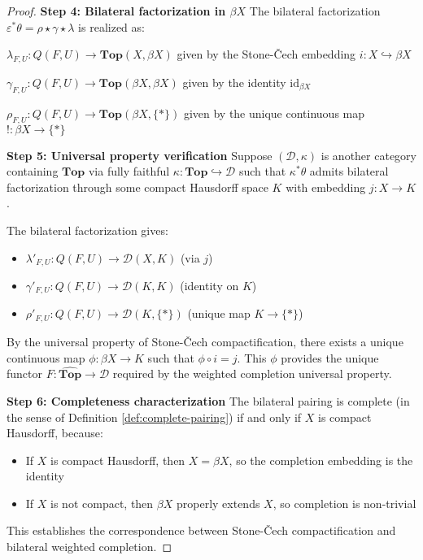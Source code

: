 \documentclass[11pt]{article}
\theoremstyle{plain}
\theoremstyle{definition}
\theoremstyle{remark}
\begin{document}
\begin{proof}
\textbf{Step 4: Bilateral factorization in $\beta X$}
The bilateral factorization $\varepsilon^* \theta = \rho \star \gamma \star \lambda$ is realized as:

$\lambda_{F,U} : Q(F, U) \to \mathbf{Top}(X, \beta X)$ given by the Stone-\v{C}ech embedding $i : X \hookrightarrow \beta X$

$\gamma_{F,U} : Q(F, U) \to \mathbf{Top}(\beta X, \beta X)$ given by the identity $\text{id}_{\beta X}$

$\rho_{F,U} : Q(F, U) \to \mathbf{Top}(\beta X, \{*\})$ given by the unique continuous map $! : \beta X \to \{*\}$

\textbf{Step 5: Universal property verification}
Suppose $(\mathcal{D}, \kappa)$ is another category containing $\mathbf{Top}$ via fully faithful $\kappa : \mathbf{Top} \hookrightarrow \mathcal{D}$ such that $\kappa^* \theta$ admits bilateral factorization through some compact Hausdorff space $K$ with embedding $j : X \to K$.

The bilateral factorization gives:
\begin{itemize}
\item $\lambda'_{F,U} : Q(F, U) \to \mathcal{D}(X, K)$ (via $j$)
\item $\gamma'_{F,U} : Q(F, U) \to \mathcal{D}(K, K)$ (identity on $K$)  
\item $\rho'_{F,U} : Q(F, U) \to \mathcal{D}(K, \{*\})$ (unique map $K \to \{*\}$)
\end{itemize}

By the universal property of Stone-\v{C}ech compactification, there exists a unique continuous map $\phi : \beta X \to K$ such that $\phi \circ i = j$. This $\phi$ provides the unique functor $F : \widehat{\mathbf{Top}} \to \mathcal{D}$ required by the weighted completion universal property.

\textbf{Step 6: Completeness characterization}
The bilateral pairing is complete (in the sense of Definition \ref{def:complete-pairing}) if and only if $X$ is compact Hausdorff, because:
\begin{itemize}
\item If $X$ is compact Hausdorff, then $X = \beta X$, so the completion embedding is the identity
\item If $X$ is not compact, then $\beta X$ properly extends $X$, so completion is non-trivial
\end{itemize}

This establishes the correspondence between Stone-\v{C}ech compactification and bilateral weighted completion.
\end{proof}
\end{document}
